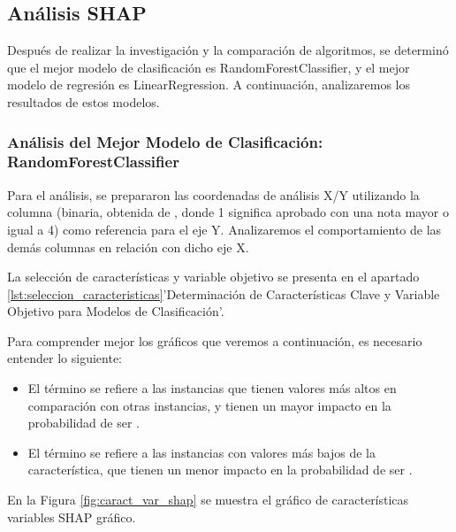 \subsection{Análisis SHAP}

Después de realizar la investigación y la comparación de algoritmos, se determinó que el mejor modelo de clasificación es RandomForestClassifier, y el mejor modelo de regresión es LinearRegression. A continuación, analizaremos los resultados de estos modelos.

\subsubsection{Análisis del Mejor Modelo de Clasificación: RandomForestClassifier}


Para el análisis, se prepararon las coordenadas de análisis X/Y utilizando la columna  (binaria, obtenida de , donde 1 significa aprobado con una nota mayor o igual a 4) como referencia para el eje Y. Analizaremos el comportamiento de las demás columnas en relación con dicho eje X.

La selección de características y variable objetivo se presenta en el apartado \ref{lst:seleccion_caracteristicas}{'Determinación de Características Clave y Variable Objetivo para Modelos de Clasificación'}.

Para comprender mejor los gráficos que veremos a continuación, es necesario entender lo siguiente:

\begin{itemize}
    \item El término  se refiere a las instancias que tienen valores más altos en comparación con otras instancias, y tienen un mayor impacto en la probabilidad de ser .
    \item El término  se refiere a las instancias con valores más bajos de la característica, que tienen un menor impacto en la probabilidad de ser .
\end{itemize}

En la Figura \ref{fig:caract_var_shap} se muestra el gráfico de características variables SHAP gráfico.

